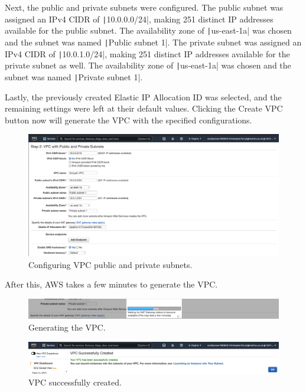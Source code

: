 Next, the public and private subnets were configured.
The public subnet was assigned an IPv4 CIDR of \texttt|10.0.0.0/24|, making 251 distinct IP addresses available
for the public subnet.
The availability zone of \texttt|us-east-1a| was chosen and the subnet was named
\texttt|Public subnet 1|.
The private subnet was assigned an IPv4 CIDR of \texttt|10.0.1.0/24|, making 251 distinct IP addresses
available for the private subnet as well.
The availability zone of \texttt|us-east-1a| was chosen and the subnet was named
\texttt|Private subnet 1|.

Lastly, the previously created Elastic IP Allocation ID was selected, and the remaining settings were left at their
default values.
Clicking the Create VPC button now will generate the VPC with the specified configurations.

\begin{figure}[!htbp]
    \centering
    \includegraphics[width=\textwidth]{resources/vpc/step_2_vpc_with_public_and_private_subnets}
    \caption{Configuring VPC public and private subnets.}
    \label{fig:vpc-step-2}
\end{figure}

After this, AWS takes a few minutes to generate the VPC\@.

\begin{figure}[!htbp]
    \centering
    \includegraphics[width=\textwidth]{resources/vpc/step_3_create_vpc}
    \caption{Generating the VPC.}
    \label{fig:vpc-step-3}
\end{figure}

\begin{figure}[!htbp]
    \centering
    \includegraphics[width=\textwidth]{resources/vpc/vpc_successfully_created}
    \caption{VPC successfully created.}
    \label{fig:vpc-step-4}
\end{figure}

